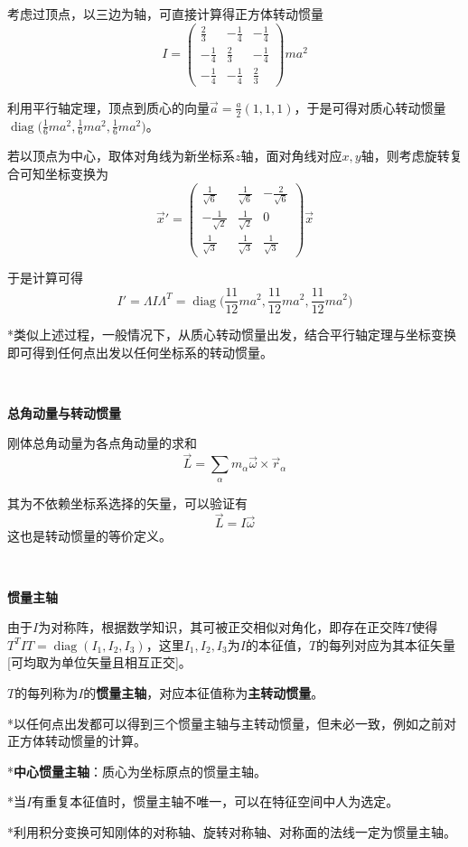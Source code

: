 \documentclass[a4paper,UTF8,fontset=windows]{ctexart}
\DeclareMathOperator{\diag}{diag}
\begin{document}
考虑过顶点，以三边为轴，可直接计算得正方体转动惯量
$$I=\begin{pmatrix}\frac{2}{3}&-\frac{1}{4}&-\frac{1}{4}\\-\frac{1}{4}&\frac{2}{3}&-\frac{1}{4}\\-\frac{1}{4}&-\frac{1}{4}&\frac{2}{3}\end{pmatrix}ma^2$$

利用平行轴定理，顶点到质心的向量$\vec{a}=\frac{a}{2}(1,1,1)$，于是可得对质心转动惯量$\diag\big(\frac{1}{6}ma^2,\frac{1}{6}ma^2,\frac{1}{6}ma^2\big)$。

若以顶点为中心，取体对角线为新坐标系$z$轴，面对角线对应$x,y$轴，则考虑旋转复合可知坐标变换为
$$\vec{x}'=\begin{pmatrix}\frac{1}{\sqrt6}&\frac{1}{\sqrt6}&-\frac{2}{\sqrt6}\\-\frac{1}{\sqrt2}&\frac{1}{\sqrt2}&0\\\frac{1}{\sqrt3}&\frac{1}{\sqrt3}&\frac{1}{\sqrt3}\end{pmatrix}\vec{x}$$

于是计算可得
$$I'=\Lambda I\Lambda^T=\diag\bigg(\frac{11}{12}ma^2,\frac{11}{12}ma^2,\frac{11}{12}ma^2\bigg)$$

*类似上述过程，一般情况下，从质心转动惯量出发，结合平行轴定理与坐标变换即可得到任何点出发以任何坐标系的转动惯量。

\

\textbf{总角动量与转动惯量}

刚体总角动量为各点角动量的求和
$$\vec{L}=\sum_\alpha m_\alpha\vec{\omega}\times\vec{r}_\alpha$$

其为不依赖坐标系选择的矢量，可以验证有
$$\vec{L}=I\vec{\omega}$$
这也是转动惯量的等价定义。

\

\textbf{惯量主轴}

由于$I$为对称阵，根据数学知识，其可被正交相似对角化，即存在正交阵$T$使得$T^TIT=\diag(I_1,I_2,I_3)$，这里$I_1,I_2,I_3$为$I$的本征值，$T$的每列对应为其本征矢量[可均取为单位矢量且相互正交]。

$T$的每列称为$I$的\textbf{惯量主轴}，对应本征值称为\textbf{主转动惯量}。

*以任何点出发都可以得到三个惯量主轴与主转动惯量，但未必一致，例如之前对正方体转动惯量的计算。

*\textbf{中心惯量主轴}：质心为坐标原点的惯量主轴。

*当$I$有重复本征值时，惯量主轴不唯一，可以在特征空间中人为选定。

*利用积分变换可知刚体的对称轴、旋转对称轴、对称面的法线一定为惯量主轴。
\end{document}
